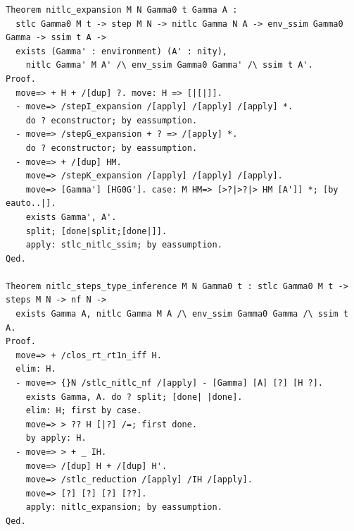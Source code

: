 \begin{lstlisting}[style=authorcoq]
Theorem nitlc_expansion M N Gamma0 t Gamma A :
  stlc Gamma0 M t -> step M N -> nitlc Gamma N A -> env_ssim Gamma0 Gamma -> ssim t A ->
  exists (Gamma' : environment) (A' : nity),
    nitlc Gamma' M A' /\ env_ssim Gamma0 Gamma' /\ ssim t A'.
Proof.
  move=> + H + /[dup] ?. move: H => [|[|]].
  - move=> /stepI_expansion /[apply] /[apply] /[apply] *.
    do ? econstructor; by eassumption.
  - move=> /stepG_expansion + ? => /[apply] *.
    do ? econstructor; by eassumption.
  - move=> + /[dup] HM.
    move=> /stepK_expansion /[apply] /[apply] /[apply].
    move=> [Gamma'] [HG0G']. case: M HM=> [>?|>?|> HM [A']] *; [by eauto..|].
    exists Gamma', A'.
    split; [done|split;[done|]].
    apply: stlc_nitlc_ssim; by eassumption.
Qed.

Theorem nitlc_steps_type_inference M N Gamma0 t : stlc Gamma0 M t -> steps M N -> nf N ->
  exists Gamma A, nitlc Gamma M A /\ env_ssim Gamma0 Gamma /\ ssim t A.
Proof.
  move=> + /clos_rt_rt1n_iff H.
  elim: H.
  - move=> {}N /stlc_nitlc_nf /[apply] - [Gamma] [A] [?] [H ?].
    exists Gamma, A. do ? split; [done| |done].
    elim: H; first by case.
    move=> > ?? H [|?] /=; first done.
    by apply: H.
  - move=> > + _ IH.
    move=> /[dup] H + /[dup] H'.
    move=> /stlc_reduction /[apply] /IH /[apply].
    move=> [?] [?] [?] [??].
    apply: nitlc_expansion; by eassumption.
Qed.


\end{lstlisting}
